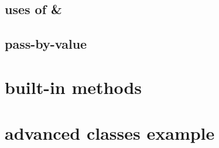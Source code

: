 \subsection{uses of \&}



\subsection{pass-by-value}



\section{built-in methods}



\section{advanced classes example}


